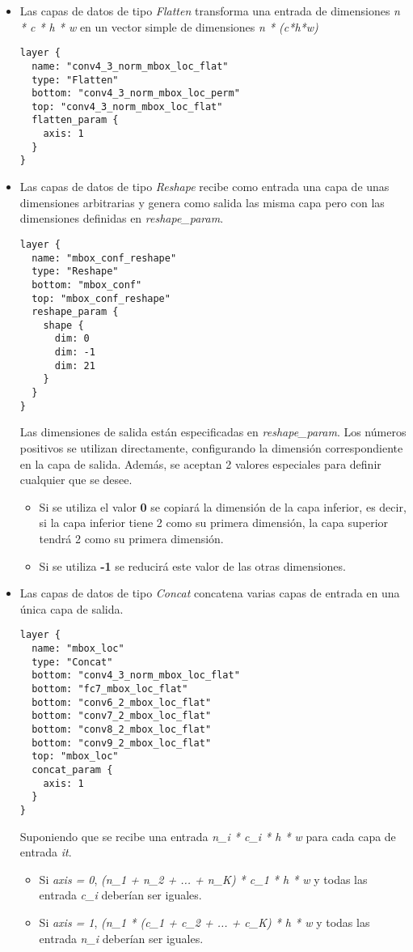 \documentclass[a4paper, 12pt, oneside]{book}
\begin{document}
\begin{itemize}
\item Las capas de datos de tipo \textit{Flatten} transforma una entrada de dimensiones \textit{n * c * h * w} en un vector simple de dimensiones \textit{n * (c*h*w)}\\
\begin{lstlisting}[frame=single]
layer {
  name: "conv4_3_norm_mbox_loc_flat"
  type: "Flatten"
  bottom: "conv4_3_norm_mbox_loc_perm"
  top: "conv4_3_norm_mbox_loc_flat"
  flatten_param {
    axis: 1
  }
}
\end{lstlisting}
\item Las capas de datos de tipo \textit{Reshape} recibe como entrada una capa de unas dimensiones arbitrarias y genera como salida las misma capa pero con las dimensiones definidas en \textit{reshape\_param}.\\
\begin{lstlisting}[frame=single]
layer {
  name: "mbox_conf_reshape"
  type: "Reshape"
  bottom: "mbox_conf"
  top: "mbox_conf_reshape"
  reshape_param {
    shape {
      dim: 0
      dim: -1
      dim: 21
    }
  }
}
\end{lstlisting}

Las dimensiones de salida están especificadas en \textit{reshape\_param}. Los números positivos se utilizan directamente, configurando la dimensión correspondiente en la capa de salida. Además, se aceptan 2 valores especiales para definir cualquier que se desee.
\begin{itemize}
\item Si se utiliza el valor \textbf{0} se copiará la dimensión de la capa inferior, es decir, si la capa inferior tiene 2 como su primera dimensión, la capa superior tendrá 2 como su primera dimensión.
\item Si se utiliza \textbf{-1} se reducirá este valor de las otras dimensiones.
\end{itemize}
\item Las capas de datos de tipo \textit{Concat} concatena varias capas de entrada en una única capa de salida.\\
\begin{lstlisting}[frame=single]
layer {
  name: "mbox_loc"
  type: "Concat"
  bottom: "conv4_3_norm_mbox_loc_flat"
  bottom: "fc7_mbox_loc_flat"
  bottom: "conv6_2_mbox_loc_flat"
  bottom: "conv7_2_mbox_loc_flat"
  bottom: "conv8_2_mbox_loc_flat"
  bottom: "conv9_2_mbox_loc_flat"
  top: "mbox_loc"
  concat_param {
    axis: 1
  }
}
\end{lstlisting}
Suponiendo que se recibe una entrada \textit{n\_i * c\_i * h * w} para cada capa de entrada \textit{it}.
\begin{itemize}
\item Si \textit{axis = 0}, \textit{(n\_1 + n\_2 + ... + n\_K) * c\_1 * h * w} y todas las entrada \textit{c\_i} deberían ser iguales.
\item Si \textit{axis = 1}, \textit{(n\_1 * (c\_1 + c\_2 + ... + c\_K) * h * w} y todas las entrada \textit{n\_i} deberían ser iguales.
\end{itemize}
\end{itemize}
\end{document}

